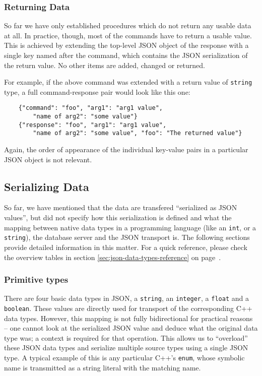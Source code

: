\documentclass{article}
\begin{document}
\subsubsection{Returning Data}

So far we have only established procedures which do not return any usable data at all.  In practice, though, most of the
commands have to return a usable value.  This is achieved by extending the top-level JSON object of the response with a
single key named after the command, which contains the JSON serialization of the return value.  No other items are
added, changed or returned.

For example, if the above command was extended with a return value of {\tt string} type, a full command-response pair
would look like this one:

\begin{lstlisting}
    {"command": "foo", "arg1": "arg1 value",
        "name of arg2": "some value"}
    {"response": "foo", "arg1": "arg1 value",
        "name of arg2": "some value", "foo": "The returned value"}
\end{lstlisting}

Again, the order of appearance of the individual key-value pairs in a particular JSON object is not relevant.

\subsection{Serializing Data}

So far, we have mentioned that the data are transfered ``serialized as JSON values'', but did not specify how this
serialization is defined and what the mapping between native data types in a programming language (like an {\tt int}, or
a {\tt string}), the database server and the JSON transport is.  The following sections provide detailed information in
this matter.  For a quick reference, please check the overview tables in section \ref{sec:json-data-types-reference} on
page~\pageref{sec:json-data-types-reference}.

\subsubsection{Primitive types}

There are four basic data types in JSON, a {\tt string}, an {\tt integer}, a {\tt float} and a {\tt boolean}.  These
values are directly used for transport of the corresponding C++ data types.  However, this mapping is not fully
bidirectional for practical reasons -- one cannot look at the serialized JSON value and deduce what the original data
type was; a context is required for that operation.  This allows us to ``overload'' these JSON data types and serialize
multiple source types using a single JSON type.  A typical example of this is any particular C++'s {\tt enum}, whose
symbolic name is transmitted as a string literal with the matching name.
\end{document}
